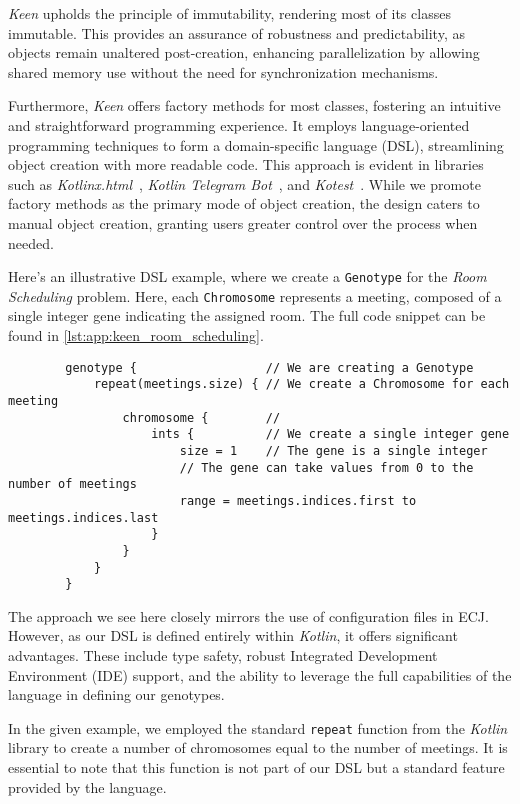     \textit{Keen} upholds the principle of immutability, rendering most of its classes immutable.
    This provides an assurance of robustness and predictability, as objects remain unaltered post-creation, enhancing parallelization by allowing shared memory use without the need for synchronization mechanisms.

    Furthermore, \textit{Keen} offers factory methods for most classes, fostering an intuitive and straightforward programming experience.
    It employs language-oriented programming techniques to form a domain-specific language (DSL), streamlining object creation with more readable code.
    This approach is evident in libraries such as \textit{Kotlinx.html}~\autocite{KotlinxHtml2023}, \textit{Kotlin Telegram Bot}~\autocite{KotlinTelegramBot2023}, and \textit{Kotest}~\autocite{KotestKotesta}.
    While we promote factory methods as the primary mode of object creation, the design caters to manual object creation, granting users greater control over the process when needed.


    Here's an illustrative DSL example, where we create a \texttt{Genotype} for the \textit{Room Scheduling} problem.
    Here, each \texttt{Chromosome} represents a meeting, composed of a single integer gene indicating the assigned room.
    The full code snippet can be found in \vref{lst:app:keen_room_scheduling}.

    \begin{verbatim}
        genotype {                  // We are creating a Genotype
            repeat(meetings.size) { // We create a Chromosome for each meeting
                chromosome {        //
                    ints {          // We create a single integer gene
                        size = 1    // The gene is a single integer
                        // The gene can take values from 0 to the number of meetings
                        range = meetings.indices.first to meetings.indices.last
                    }
                }
            }
        }
    \end{verbatim}

    The approach we see here closely mirrors the use of configuration files in 
    ECJ.
    However, as our DSL is defined entirely within \textit{Kotlin}, it offers 
    significant advantages.
    These include type safety, robust Integrated Development Environment (IDE) 
    support, and the ability to leverage the full capabilities of the language 
    in defining our genotypes.

    In the given example, we employed the standard \texttt{repeat} function 
    from the \textit{Kotlin} library to create a number of chromosomes equal to 
    the number of meetings.
    It is essential to note that this function is not part of our DSL but a 
    standard feature provided by the language.


